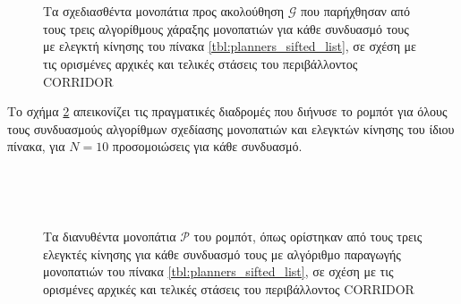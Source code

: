 \begin{figure}\centering
  \begin{subfigure}[t]{\linewidth}
    \centering
    
  \end{subfigure}\\%
  \vspace{-1cm}
  \begin{subfigure}[t]{\linewidth}
    \centering
    
  \end{subfigure}\\%
  \vspace{-1cm}
  \begin{subfigure}[t]{\linewidth}
    \centering
    
  \end{subfigure}%
  \caption{\small Τα σχεδιασθέντα μονοπάτια προς ακολούθηση $\bm{\mathcal{G}}$
           που παρήχθησαν από τους τρεις αλγορίθμους χάραξης μονοπατιών για
           κάθε συνδυασμό τους με ελεγκτή κίνησης του πίνακα
           \ref{tbl:planners_sifted_list}, σε σχέση με τις ορισμένες αρχικές και
           τελικές στάσεις του περιβάλλοντος CORRIDOR}
  \label{fig:global_plans:corridor}
\end{figure}

Το σχήμα \ref{fig:ground_truths:corridor} απεικονίζει τις πραγματικές διαδρομές
που διήνυσε το ρομπότ για όλους τους συνδυασμούς αλγορίθμων σχεδίασης μονοπατιών
και ελεγκτών κίνησης του ίδιου πίνακα, για $N=10$ προσομοιώσεις για κάθε
συνδυασμό.

\begin{figure}\centering
  \begin{subfigure}[t]{\linewidth}
    \centering
    
  \end{subfigure}\\%
  \vspace{-1cm}
  \begin{subfigure}[t]{\linewidth}
    \centering
    
  \end{subfigure}\\%
  \vspace{-1cm}
  \begin{subfigure}[t]{\linewidth}
    \centering
    
  \end{subfigure}%
  \caption{\small Τα διανυθέντα μονοπάτια $\bm{\mathcal{P}}$ του ρομπότ, όπως
           ορίστηκαν από τους τρεις ελεγκτές κίνησης για κάθε συνδυασμό τους με
           αλγόριθμο παραγωγής μονοπατιών του πίνακα
           \ref{tbl:planners_sifted_list}, σε σχέση με τις ορισμένες αρχικές και
           τελικές στάσεις του περιβάλλοντος CORRIDOR}
  \label{fig:ground_truths:corridor}
\end{figure}


